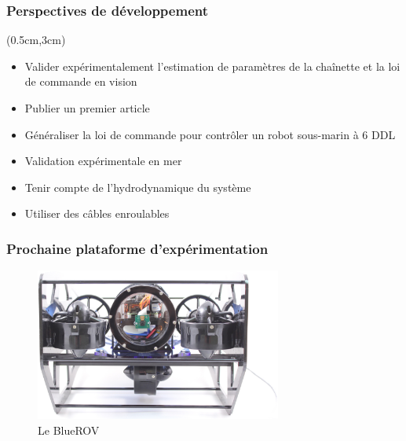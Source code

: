 \documentclass[10pt]{beamer}
\begin{document}
\begin{frame}
\frametitle{Perspectives de développement}
\begin{textblock*}{12cm}(0.5cm,3cm) %
\begin{itemize}
\item Valider expérimentalement l'estimation de paramètres de la chaînette et la loi de commande en vision
\item Publier un premier article
\item Généraliser la loi de commande pour contrôler un robot sous-marin à 6 DDL
\item Validation expérimentale en mer
\item Tenir compte de l'hydrodynamique du système
\item Utiliser des câbles enroulables
\end{itemize}
\end{textblock*}
\end{frame}

\begin{frame}
\frametitle{Prochaine plataforme d'expérimentation}
\begin{figure}
\includegraphics[height= 5cm]{Pictures/blueRov.jpg}
\caption{Le BlueROV}
\end{figure}
\end{frame}
\end{document}
